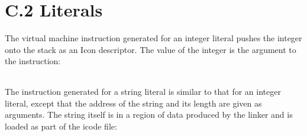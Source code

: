 \begin{noIndex}
\begin{flushleft}
\tablelasttail{\hline}
\begin{xtabular}{|m{1.9066598in}|m{2.75596in}|}

\end{xtabular}
\end{flushleft}

\bigskip

\begin{flushleft}
\tablelasttail{\hline}
\begin{xtabular}{|m{1.9066598in}|m{2.75596in}|}

\end{xtabular}
\end{flushleft}


\section{C.2 Literals}

The virtual machine instruction generated for an integer literal
pushes the integer onto the stack as an Icon descriptor. The value of
the integer is the argument to the instruction:

\begin{flushleft}
\tablelasttail{\hline}
\begin{xtabular}{|m{1.9066598in}|m{2.75596in}|}

\end{xtabular}
\end{flushleft}

The instruction generated for a string literal is similar to that for
an integer literal, except that the address of the string and its
length are given as arguments. The string itself is in a region of
data produced by the linker and is loaded as part of the icode file:

\begin{flushleft}
\tablelasttail{\hline}
\begin{xtabular}{|m{1.9066598in}|m{2.75596in}|}


\end{xtabular}
\end{flushleft}
\end{noIndex}
